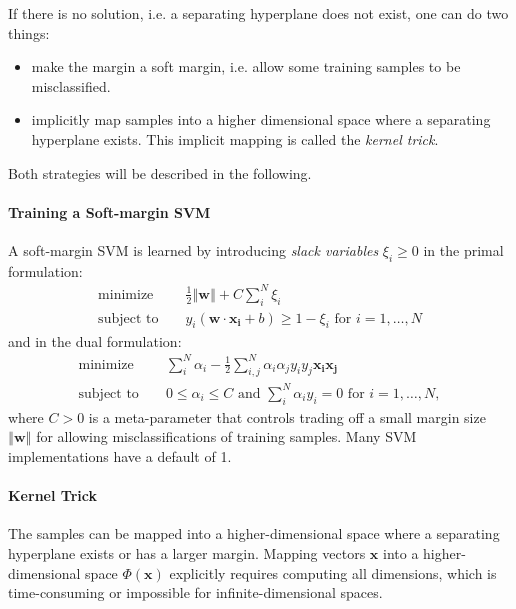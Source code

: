 If there is no solution, i.e. a separating hyperplane does not exist,
one can do two things:
\begin{itemize}
\item make the margin a soft margin, i.e. allow some training samples to
be misclassified.
\item implicitly map samples into a higher dimensional space where a separating
hyperplane exists. This implicit mapping is called the \emph{kernel
trick}.
\end{itemize}
Both strategies will be described in the following.

\paragraph{Training a Soft-margin SVM}

A soft-margin SVM is learned by introducing \emph{slack
variables }$\xi_{i}\geq0$ in the primal formulation:
\begin{eqnarray*}
\mbox{minimize } &  & \frac{1}{2}\left\Vert \mathbf{w}\right\Vert +C\sum_{i}^{N}\xi_{i}\\
\mbox{subject to } &  & y_{i}(\mathbf{w}\cdot\mathbf{x_{i}}+b)\geq1-\xi_{i}\mbox{ for }i=1,\dots,N
\end{eqnarray*}
and in the dual formulation:
\begin{eqnarray}
\mbox{minimize } &  & \sum_{i}^{N}\alpha_{i}-\frac{1}{2}\sum_{i,j}^{N}\alpha_{i}\alpha_{j}y_{i}y_{j}\mathbf{x_{i}}\mathbf{x_{j}}\label{eq:soft-margin-SVM-dual-formulation-min-w}\\
\mbox{subject to } &  & 0\leq\alpha_{i}\leq C\mbox{ and }\sum_{i}^{N}\alpha_{i}y_{i}=0\mbox{ for }i=1,\dots,N,\nonumber 
\end{eqnarray}
where $C>0$ is a meta-parameter that controls trading off a small
margin size $\left\Vert \mathbf{w}\right\Vert $ for allowing misclassifications
of training samples. Many SVM implementations have a default of 1.

\paragraph{Kernel Trick}

The samples can be mapped into a higher-dimensional
space where a separating hyperplane exists or has a larger margin.
Mapping vectors $\mathbf{x}$ into a higher-dimensional space $\Phi(\mathbf{x})$
explicitly requires computing all dimensions, which is time-consuming
or impossible for infinite-dimensional spaces.

